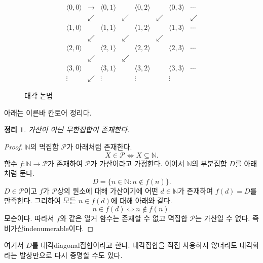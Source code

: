 \documentclass[a4paper,chapter,atbegshi]{oblivoir}
\newtheorem{theo}{정리}[chapter]
\begin{document}
\begin{figure}[h]
\[
\begin{matrix}
\langle 0,0\rangle &\rightarrow &\langle 0,1\rangle & &\langle0,2\rangle & &\langle 0,3\rangle &\cdots \\
&\swarrow & &\swarrow & &\swarrow & &\swarrow \\
\langle 1,0\rangle & &\langle 1,1\rangle & &\langle 1,2\rangle &&\langle1,3\rangle&\cdots \\
&\swarrow &&\swarrow &&\swarrow && \\
\langle2,0\rangle&&\langle2,1\rangle&&\langle2,2\rangle&&\langle2,3\rangle&\cdots\\
&\swarrow&&\swarrow&&&&\\
\langle3,0\rangle&&\langle3,1\rangle&&\langle3,2\rangle&&\langle3,3\rangle&\cdots\\
\vdots&\swarrow&\vdots&&\vdots&&\vdots&
\end{matrix}
\]
\caption{\label{fig:1-1}대각 논법}
\end{figure}
아래는 이른바 칸토어 정리다.
\begin{theo}\label{theo:1-2}
  가산이 아닌 무한집합이 존재한다.
\end{theo}
\begin{proof}
  $\mathbb{N}$의 멱집합 $\mathcal{P}$가 아래처럼 존재한다.
  \[
    X\in\mathcal{P}\iff X\subseteq\mathbb{N}.
  \]
  함수 $f:\mathbb{N}\rightarrow\mathcal{P}$가 존재하여 $\mathcal{P}$가 
  가산이라고 가정한다. 이어서 $\mathbb{N}$의 부분집합 $D$를 아래처럼
  둔다.
  \[
    D=\{n\in\mathbb{N}:n\notin f(n)\}.
  \]
  $D\in\mathcal{P}$이고 $f$가 $\mathcal{P}$상의 원소에 대해 가산이기에 어떤
  $d\in\mathbb{N}$가 존재하여 $f(d)=D$를 만족한다. 그리하여 모든 $n\in 
  f(d)$에 대해 아래와 같다. 
  \[
    n\in f(d) \iff n \notin f(n).
  \]
  모순이다. 따라서 $f$와 같은 열거 함수는 존재할 수 없고
  멱집합 $\mathcal{P}$는 가산일 수 없다. 즉 비가산{\tiny indenumerable}이다. 
\end{proof}
여기서 $D$를 대각{\tiny diagonal}집합이라고 한다. 대각집합을 직접 사용하지
않더라도 대각화라는 발상만으로 다시 증명할 수도 있다.
\end{document}
